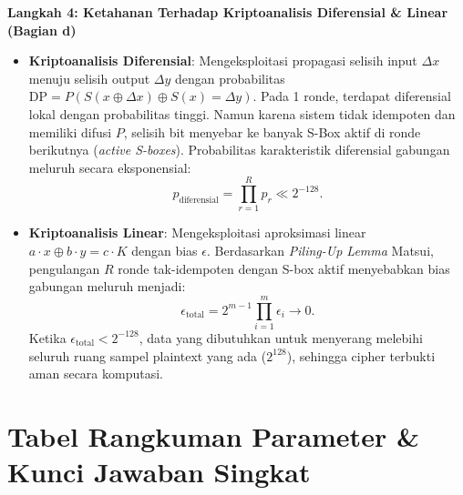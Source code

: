 \documentclass[11pt,a4paper]{article}
\begin{document}
\noindent\textbf{Langkah 4: Ketahanan Terhadap Kriptoanalisis Diferensial \& Linear (Bagian d)}
\begin{itemize}
    \item \textbf{Kriptoanalisis Diferensial}: Mengeksploitasi propagasi selisih input $\Delta x$ menuju selisih output $\Delta y$ dengan probabilitas $\mathrm{DP} = P(S(x \oplus \Delta x) \oplus S(x) = \Delta y)$. Pada 1 ronde, terdapat diferensial lokal dengan probabilitas tinggi. Namun karena sistem tidak idempoten dan memiliki difusi $P$, selisih bit menyebar ke banyak S-Box aktif di ronde berikutnya (\textit{active S-boxes}). Probabilitas karakteristik diferensial gabungan meluruh secara eksponensial:
    \[
    p_{\text{diferensial}} = \prod_{r=1}^R p_r \ll 2^{-128}.
    \]
    \item \textbf{Kriptoanalisis Linear}: Mengeksploitasi aproksimasi linear $a \cdot x \oplus b \cdot y = c \cdot K$ dengan bias $\epsilon$. Berdasarkan \textit{Piling-Up Lemma} Matsui, pengulangan $R$ ronde tak-idempoten dengan S-box aktif menyebabkan bias gabungan meluruh menjadi:
    \[
    \epsilon_{\text{total}} = 2^{m-1} \prod_{i=1}^m \epsilon_i \to 0.
    \]
    Ketika $\epsilon_{\text{total}} < 2^{-128}$, data yang dibutuhkan untuk menyerang melebihi seluruh ruang sampel plaintext yang ada ($2^{128}$), sehingga cipher terbukti aman secara komputasi.
\end{itemize}

\vspace{0.6cm}

\section{Tabel Rangkuman Parameter \& Kunci Jawaban Singkat}
\end{document}
